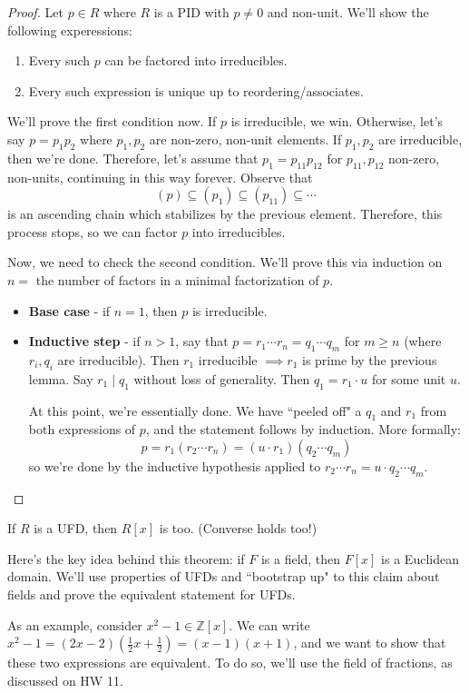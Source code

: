 \documentclass{article}
\theoremstyle{plain}
\newcommand{\Z}{\mathbb{Z}}
\begin{document}
\begin{proof}
	Let $p \in R$ where $R$ is a PID with $p \ne 0$ and non-unit. We'll show the following experessions:
	\begin{enumerate}
	\item Every such $p$ can be factored into irreducibles.
	\item Every such expression is unique up to	reordering/associates.
	\end{enumerate}
We'll prove the first condition now. If $p$ is irreducible, we win. Otherwise, let's say $p = p_1p_2$ where $p_1,p_2$ are non-zero, non-unit elements. If $p_1,p_2$ are irreducible, then we're done. Therefore, let's assume that $p_1 = p_{11}p_{12}$ for $p_{11}, p_{12}$ non-zero, non-units, continuing in this way forever. Observe that
	$$(p) \subseteq (p_1) \subseteq (p_11) \subseteq \cdots$$
	is an ascending chain which stabilizes by the previous element. Therefore, this process stops, so we can factor $p$ into irreducibles.
	
	Now, we need to check the second condition. We'll prove this via induction on $n = $ the number of factors in a minimal factorization of $p$.
	\begin{itemize}
	\item \textbf{Base case} - if $n = 1$, then $p$ is irreducible.
	\item \textbf{Inductive step} - if $n > 1$, say that $p=r_1\cdots r_n = q_1\cdots q_m$ for $m \ge n$ (where $r_i, q_i$ are irreducible). Then $r_1$ irreducible $\implies r_1$ is prime by the previous lemma. Say $r_1\mid q_1$ without loss of generality. Then $q_1 = r_1\cdot u$ for some unit $u$.
	
	At this point, we're essentially done. We have ``peeled off" a $q_1$ and $r_1$ from both expressions of $p$, and the statement follows by induction. More formally:
	$$p = r_1(r_2 \cdots r_n) = (u\cdot r_1)(q_2\cdots q_m)$$
	so we're done by the inductive hypothesis applied to $r_2 \cdots r_n = u\cdot q_2 \cdots q_m$.
	\end{itemize}
\end{proof}
\begin{theorem}{}{}
	If $R$ is a UFD, then $R[x]$ is too. (Converse holds too!)
\end{theorem}
Here's the key idea behind this theorem: if $F$ is a field, then $F[x]$ is a Euclidean domain. We'll use properties of UFDs and ``bootstrap up" to this claim about fields and prove the equivalent statement for UFDs.	

As an example, consider $x^2 - 1 \in \Z[x]$. We can write $x^2 - 1 = (2x-2)(\frac{1}{2}x + \frac{1}{2}) = (x-1)(x+1)$, and we want to show that these two expressions are equivalent. To do so, we'll use the field of fractions, as discussed on HW 11.
\end{document}
